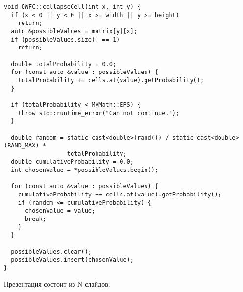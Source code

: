 \begin{lstlisting}[caption={Метод фиксирования состояния ячейки класса QWFC}, label={lst:qwfcoll}]
void QWFC::collapseCell(int x, int y) {
  if (x < 0 || y < 0 || x >= width || y >= height)
    return;
  auto &possibleValues = matrix[y][x];
  if (possibleValues.size() == 1)
    return;

  double totalProbability = 0.0;
  for (const auto &value : possibleValues) {
    totalProbability += cells.at(value).getProbability();
  }

  if (totalProbability < MyMath::EPS) {
    throw std::runtime_error("Can not continue.");
  }

  double random = static_cast<double>(rand()) / static_cast<double>(RAND_MAX) *
                  totalProbability;
  double cumulativeProbability = 0.0;
  int chosenValue = *possibleValues.begin();

  for (const auto &value : possibleValues) {
    cumulativeProbability += cells.at(value).getProbability();
    if (random <= cumulativeProbability) {
      chosenValue = value;
      break;
    }
  }

  possibleValues.clear();
  possibleValues.insert(chosenValue);
}
\end{lstlisting}

\newpage

\renewcommand\thechapter{B}


Презентация состоит из N слайдов.